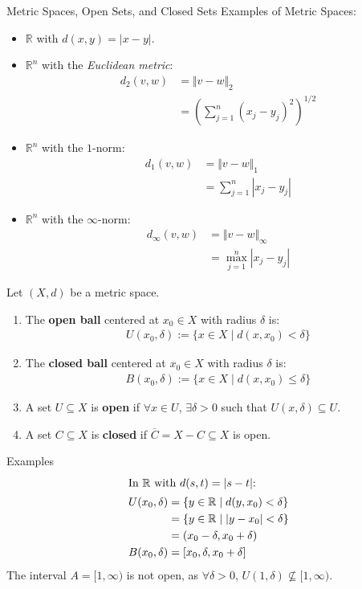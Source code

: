 \documentclass[10pt]{extarticle}
\newcommand{\R}{\mathbb{R}}
\begin{document}
  \begin{problem}{Metric Spaces, Open Sets, and Closed Sets}
    Examples of Metric Spaces:
    \begin{itemize}
      \item $\R$ with $d(x,y) = |x-y|$.
      \item $\R^n$ with the \textit{Euclidean metric}:
        \begin{align*}
          d_2(v,w) &= \Vert v - w \Vert_2\\
                   &= \left(\sum_{j=1}^{n}(x_j-y_j)^2\right)^{1/2}
        \end{align*}
      \item $\R^n$ with the $1$-norm:
        \begin{align*}
          d_1(v,w) &= \Vert v-w\Vert_1\\
                   &= \sum_{j=1}^{n} |x_j-y_j|
        \end{align*}
      \item $\R^n$ with the $\infty$-norm:
        \begin{align*}
          d_{\infty}(v,w) &= \Vert v-w\Vert_{\infty}\\
                          &= \max_{j=1}^{n} |x_j-y_j|
        \end{align*}
    \end{itemize}
    Let $(X,d)$ be a metric space.
    \begin{enumerate}[(1)]
      \item The \textbf{open ball} centered at $x_0\in X$ with radius $\delta$ is:
        \begin{align*}
        U(x_0,\delta) := \{x\in X \mid d(x,x_0) < \delta\}
        \end{align*}
      \item The \textbf{closed ball} centered at $x_0\in X$  with radius $\delta$ is:
        \begin{align*}
          B(x_0,\delta) := \{x\in X \mid d(x,x_0) \leq \delta\}
        \end{align*}
      \item A set $U\subseteq X$ is \textbf{open} if $\forall x\in U$, $\exists \delta > 0$ such that $U(x,\delta)\subseteq U$.
      \item A set $C\subseteq X$ is \textbf{closed} if $\overline{C} = X-C\subseteq X$ is open.
    \end{enumerate}
    \begin{problem}{Examples}
      \begin{align*}
        \shortintertext{In $\R$ with $d(s,t) = |s-t|$:}
        U(x_0,\delta) &= \{y\in\R \mid d(y,x_0) < \delta\}\\
                      &= \{y\in\R \mid |y-x_0| < \delta\}\\
                      &= (x_0-\delta,x_0+\delta)\\
        B(x_0,\delta) &= [x_0,\delta,x_0+\delta]
      \end{align*}
      The interval $A = [1,\infty)$ is not open, as $\forall \delta > 0$, $U(1,\delta)\not\subseteq [1,\infty)$.\\


\end{problem}
\end{problem}
\end{document}
